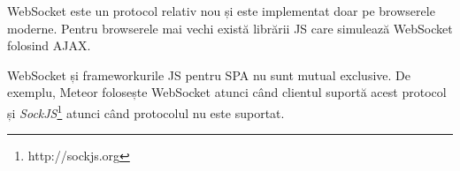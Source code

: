 WebSocket este un protocol relativ nou și este implementat doar pe browserele moderne.
Pentru browserele mai vechi există librării JS care simulează WebSocket folosind
AJAX.

WebSocket și frameworkurile JS pentru SPA nu sunt mutual
exclusive. De exemplu, Meteor folosește WebSocket atunci când clientul suportă
acest protocol și \emph{SockJS}\footnote{http://sockjs.org} atunci când protocolul 
nu este suportat.


